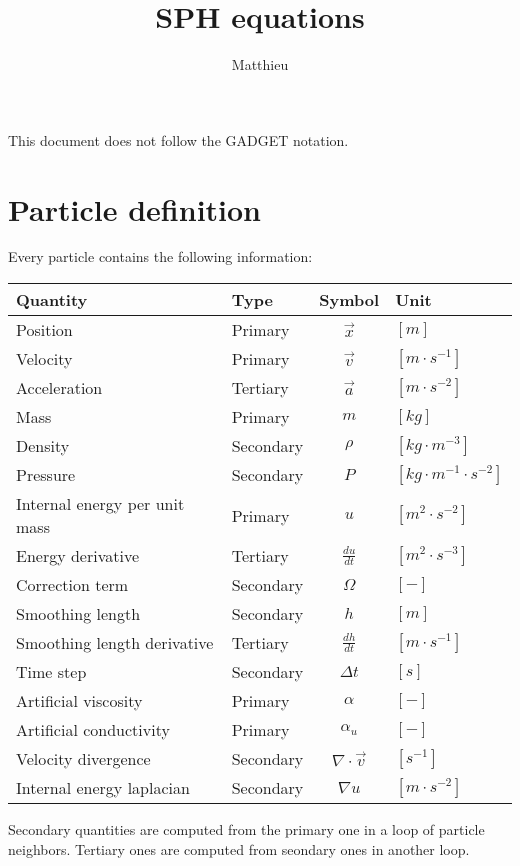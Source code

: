 \documentclass[a4paper,10pt]{article}
\title{SPH equations}
\author{Matthieu}
\begin{document}
\maketitle

This document does not follow the GADGET notation.\\

\section{Particle definition}
Every particle contains the following information:

\begin{table}[h]
\centering
\begin{tabular}{|l|l|c|l|}
 Quantity & Type & Symbol & Unit \\
 \hline \hline
 Position & Primary & $\vec{x}$ & $[m]$ \\
 Velocity & Primary &$\vec{v}$ & $[m\cdot s^{-1}]$ \\
 Acceleration & Tertiary &$\vec{a}$ & $[m\cdot s^{-2}]$ \\
 Mass & Primary &$m$ & $[kg]$ \\
 Density & Secondary & $\rho$ & $[kg\cdot m^{-3}]$ \\
 Pressure & Secondary & $P$ & $[kg \cdot m^{-1}\cdot s^{-2}]$ \\
 Internal energy per unit mass & Primary & $u$ & $[m^2 \cdot s^{-2}]$ \\ 
 Energy derivative & Tertiary & $\frac{du}{dt}$ & $[ m^2 \cdot s^{-3}]$ \\
 Correction term & Secondary & $\Omega$ & $[-]$ \\
 Smoothing length & Secondary &$h$ & $[m]$ \\
 Smoothing length derivative & Tertiary &$\frac{dh}{dt}$ & $[m\cdot s^{-1}]$ \\
 Time step & Secondary & $\Delta t$ & $[s]$ \\
\hline
 Artificial viscosity & Primary & $\alpha$ & $[-]$\\
 Artificial conductivity & Primary & $\alpha_u$ & $[-]$\\
 Velocity divergence & Secondary & $\nabla\cdot \vec{v}$ & $[s^{-1}]$ \\
 Internal energy laplacian & Secondary & $\nabla u$ & $[m\cdot s^{-2}]$\\
\hline
\end{tabular} 
\end{table}

Secondary quantities are computed from the primary one in a loop of particle neighbors. Tertiary ones are computed from
seondary ones in another loop. \\
\end{document}
